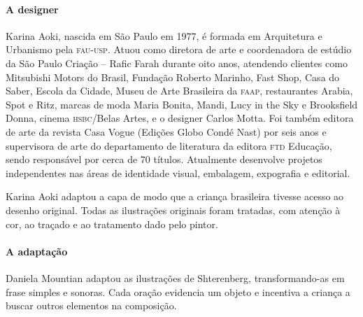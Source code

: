 \documentclass[11pt]{extarticle}
\begin{document}
\paragraph{A designer} Karina Aoki, nascida em São Paulo em 1977, é formada em Arquitetura e Urbanismo pela \textsc{fau-usp}. Atuou como diretora de arte e coordenadora de estúdio da São Paulo Criação -- Rafic Farah durante oito anos, atendendo clientes como Mitsubishi Motors do Brasil, Fundação Roberto Marinho, Fast Shop, Casa do Saber, Escola da Cidade, Museu de Arte Brasileira da \textsc{faap}, restaurantes Arabia, Spot e Ritz, marcas de moda Maria Bonita, Mandi, Lucy in the Sky e
Brooksfield Donna, cinema \textsc{hsbc}/Belas Artes, e o designer Carlos Motta. Foi também editora de arte da revista Casa Vogue (Edições Globo Condé Nast) por seis anos e supervisora de arte do departamento de literatura da editora \textsc{ftd} Educação, sendo responsável por cerca de 70 títulos. Atualmente desenvolve projetos independentes nas áreas de identidade visual, embalagem, expografia e editorial.

Karina Aoki adaptou a capa de modo que a criança brasileira tivesse acesso ao
desenho original. Todas as ilustrações originais foram tratadas, com atenção à cor, ao traçado e ao tratamento dado pelo pintor.

\paragraph{A adaptação} 
Daniela Mountian adaptou as ilustrações de Shterenberg, transformando-as em frase simples e sonoras. Cada oração evidencia um objeto e incentiva a criança a buscar outros elementos na composição.
\end{document}
